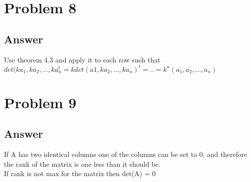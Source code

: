 \documentclass{article}
\begin{document}
\section*{Problem 8}
\subsection*{Answer}
Use theorem 4.3 and apply it to each row such that \\
\(det(ka_{1},ka_{2},...,ka_{n}^{t} = kdet(a1, ka_{2},...,ka_{n})^{t} = .. = k^{n} (a_{1},a_{2},...,a_{n})\)
\section*{Problem 9}
\subsection*{Answer}
If A has two identical columns one of the columns can be set to 0, and therefore the rank of the matrix is one less than it should be.
\\If rank is not max for the matrix then det(A) = 0
\end{document}
